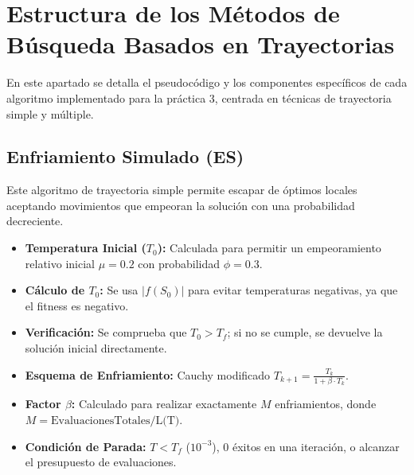 \newpage
\section{Estructura de los Métodos de Búsqueda Basados en Trayectorias}
\label{sec:algoritmos}

En este apartado se detalla el pseudocódigo y los componentes específicos de cada 
algoritmo implementado para la práctica 3, centrada en técnicas de trayectoria 
simple y múltiple.

\subsection{Enfriamiento Simulado (ES)}

Este algoritmo de trayectoria simple permite escapar de óptimos locales aceptando 
movimientos que empeoran la solución con una probabilidad decreciente.

\begin{itemize}[noitemsep]
    \item \textbf{Temperatura Inicial ($T_0$):} Calculada para permitir un empeoramiento 
    relativo inicial $\mu=0.2$ con probabilidad $\phi=0.3$.
    \item \textbf{C\'{a}lculo de $T_0$:} Se usa $|f(S_0)|$ para evitar temperaturas negativas, ya que el fitness es negativo.
    \item \textbf{Verificación:} Se comprueba que $T_0 > T_f$; si no se cumple, se devuelve la solución inicial directamente.
    \item \textbf{Esquema de Enfriamiento:} Cauchy modificado $T_{k+1} = \frac{T_k}{1 + \beta \cdot T_k}$.
    \item \textbf{Factor $\beta$:} Calculado para realizar exactamente $M$ enfriamientos, 
    donde $M = \text{EvaluacionesTotales} / \text{L(T)}$.
    \item \textbf{Condición de Parada:} $T < T_f$ ($10^{-3}$), 0 éxitos en una iteración, 
    o alcanzar el presupuesto de evaluaciones.
\end{itemize}

